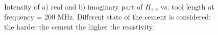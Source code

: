 \documentclass[10pt,twoside]{article}
\begin{document}
\begin{figure}[ht!]
\begin{minipage}{0.5\linewidth}
\end{minipage}
\hfill
\begin{minipage}{0.5\linewidth}
\end{minipage}
\caption{ Intensity of a) real and b) imaginary part of $H_{z,s}$ vs. tool length at frequency = 200 MHz. Different state of the cement is considered: the harder the cement the higher the resistivity.}
\label{cement_hard}\

\end{figure}
\end{document}
